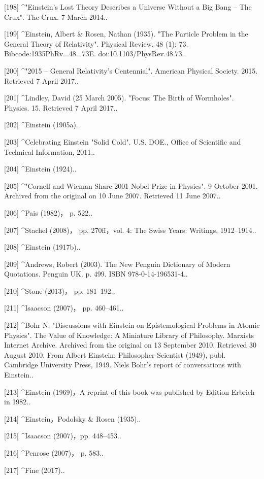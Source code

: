 [198]
^"Einstein's Lost Theory Describes a Universe Without a Big Bang – The Crux". The Crux. 7 March 2014..

[199]
^Einstein, Albert & Rosen, Nathan (1935). "The Particle Problem in the General Theory of Relativity". Physical Review. 48 (1): 73. Bibcode:1935PhRv...48...73E. doi:10.1103/PhysRev.48.73..

[200]
^"2015 – General Relativity's Centennial". American Physical Society. 2015. Retrieved 7 April 2017..

[201]
^Lindley, David (25 March 2005). "Focus: The Birth of Wormholes". Physics. 15. Retrieved 7 April 2017..

[202]
^Einstein (1905a)..

[203]
^Celebrating Einstein "Solid Cold". U.S. DOE., Office of Scientific and Technical Information, 2011..

[204]
^Einstein (1924)..

[205]
^"Cornell and Wieman Share 2001 Nobel Prize in Physics". 9 October 2001. Archived from the original on 10 June 2007. Retrieved 11 June 2007..

[206]
^Pais (1982)， p. 522..

[207]
^Stachel (2008)， pp. 270ff，vol. 4: The Swiss Years: Writings, 1912–1914..

[208]
^Einstein (1917b)..

[209]
^Andrews, Robert (2003). The New Penguin Dictionary of Modern Quotations. Penguin UK. p. 499. ISBN 978-0-14-196531-4..

[210]
^Stone (2013)， pp. 181–192..

[211]
^Isaacson (2007)， pp. 460–461..

[212]
^Bohr N. "Discussions with Einstein on Epistemological Problems in Atomic Physics". The Value of Knowledge: A Miniature Library of Philosophy. Marxists Internet Archive. Archived from the original on 13 September 2010. Retrieved 30 August 2010. From Albert Einstein: Philosopher-Scientist (1949), publ. Cambridge University Press, 1949. Niels Bohr's report of conversations with Einstein..

[213]
^Einstein (1969)，A reprint of this book was published by Edition Erbrich in 1982..

[214]
^Einstein，Podolsky & Rosen (1935)..

[215]
^Isaacson (2007)，pp. 448–453..

[216]
^Penrose (2007)， p. 583..

[217]
^Fine (2017)..

